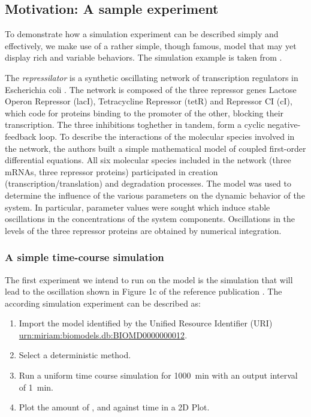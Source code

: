 \subsection{Motivation: A sample experiment}
\label{motivation:example}
To demonstrate how a simulation experiment can be described simply and effectively, we make use of a rather simple, though famous, model that may yet display rich and variable behaviors. The simulation example is taken from \citep{Waltemath:2010}. 

 The \emph{repressilator} is a synthetic oscillating network of transcription regulators in Escherichia coli \citep{Elowitz:2000}.
  The network is composed of the three repressor genes Lactose Operon Repressor (lacI), Tetracycline Repressor (tetR) and Repressor CI (cI), which code for proteins binding to the promoter of the other, blocking their transcription. The three inhibitions toghether in tandem, form a cyclic negative-feedback loop. 
 To describe the interactions of the molecular species involved in the network, the authors built a simple mathematical model of coupled first-order differential equations. All six molecular species included in the network (three mRNAs, three repressor proteins) participated in creation (transcription/translation) and degradation processes. The model was used to determine the influence of the various parameters on the dynamic behavior of the system. In particular, parameter values were sought which induce stable oscillations in the concentrations of the system components. Oscillations in the levels of the three repressor proteins are obtained by numerical integration. 

\subsubsection{A simple time-course simulation}
 \label{sec:intro1}
 The first experiment we intend to run on the model is the simulation that will lead to the oscillation shown in Figure 1c of the reference publication \citep{Elowitz:2000}. The according simulation experiment can be described as:

\begin{enumerate}
 	\item{Import the model identified by the Unified Resource Identifier (URI) \citep{Berners-Lee:2005} \url{urn:miriam:biomodels.db:BIOMD0000000012}.}
 	\item {Select a deterministic method.}
 	\item{Run a uniform time course simulation for 1000~min with an output interval of 1~min.}
 	\item{Plot the amount of ,  and  against time in a 2D Plot.}
 \end{enumerate}

